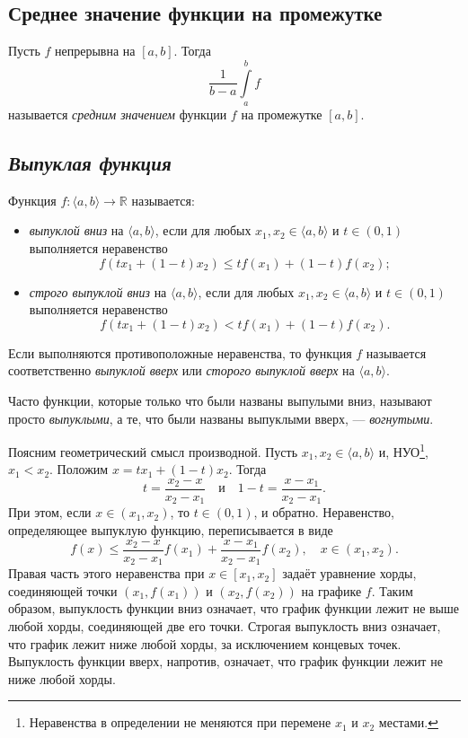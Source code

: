 \subsection{Среднее значение функции на промежутке}

\hypertarget{average}{}
\begin{definition}
	Пусть $f$ непрерывна на $[a, b]$. Тогда \[
	\dfrac1{b - a}\int\limits_a^b f
	\]
	называется \textit{средним значением} функции $f$ на промежутке $[a, b]$.
\end{definition}

\subsection{\itshape Выпуклая функция}

\begin{definition}
	Функция \(f \colon \langle a, b \rangle \to \mathbb{R}\) называется:
	\begin{itemize}
		\item \textit{выпуклой вниз} на \(\langle a, b \rangle\), если для любых \(x_1, x_2 \in \langle a, b \rangle\) и \(t \in (0, 1)\) выполняется неравенство \[
		f(t x_1 + (1 - t) x_2) \leqslant t f(x_1) + (1 - t) f(x_2);
		\]
		\item \textit{строго выпуклой вниз} на \(\langle a, b \rangle\), если для любых \(x_1, x_2 \in \langle a, b \rangle\) и \(t \in (0, 1)\) выполняется неравенство \[
		f(t x_1 + (1 - t) x_2) < t f(x_1) + (1 - t) f(x_2).
		\]
	\end{itemize}
	
	Если выполняются противоположные неравенства, то функция \(f\) называется соответственно \textit{выпуклой вверх} или \textit{сторого выпуклой вверх} на \(\langle a, b \rangle\).
	
	Часто функции, которые только что были названы выпулыми вниз, называют просто \textit{выпуклыми}, а те, что были названы выпуклыми вверх, --- \textit{вогнутыми}.
	
	Поясним геометрический смысл производной. Пусть \(x_1, x_2 \in \langle a, b \rangle\) и, НУО\footnote{Неравенства в определении не меняются при перемене \(x_1\) и \(x_2\) местами.}, \(x_1 < x_2\). Положим \(x = t x_1 + (1 - t) x_2\). Тогда \[
	t = \frac{x_2 - x}{x_2 - x_1} \quad \text{и} \quad 1 - t = \frac{x - x_1}{x_2 - x_1}.
	\]
	При этом, если \(x \in (x_1, x_2)\), то \(t \in (0, 1)\), и обратно. Неравенство, определяющее выпуклую функцию, переписывается в виде \[
	f(x) \leqslant \frac{x_2 - x}{x_2 - x_1} f(x_1) + \frac{x - x_1}{x_2 - x_1} f(x_2), \quad x \in (x_1, x_2).
	\]
	Правая часть этого неравенства при \(x \in [x_1, x_2]\) задаёт уравнение хорды, соединяющей точки \((x_1, f(x_1))\) и \((x_2, f(x_2))\) на графике \(f\). Таким образом, выпуклость функции вниз означает, что график функции лежит не выше любой хорды, соединяющей две его точки. Строгая выпуклость вниз означает, что график лежит ниже любой хорды, за исключением концевых точек. Выпуклость функции вверх, напротив, означает, что график функции лежит не ниже любой хорды.
\end{definition}


